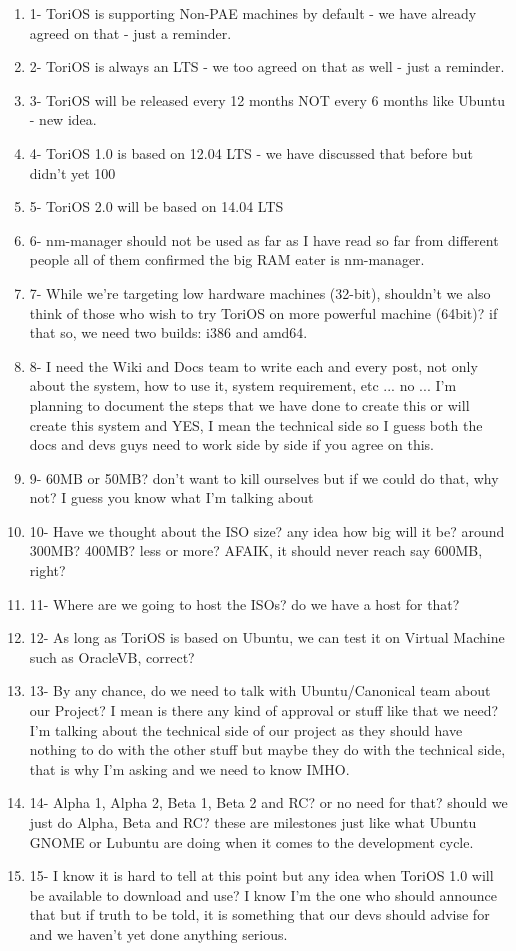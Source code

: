 \documentclass[12pt,a4paper]{book}
\begin{document}
\begin{enumerate}
\item 1- ToriOS is supporting Non-PAE machines by default - we have already agreed on that - just a reminder.
\item 2- ToriOS is always an LTS - we too agreed on that as well - just a reminder.
\item3- ToriOS will be released every 12 months NOT every 6 months like Ubuntu - new idea.
\item4- ToriOS 1.0 is based on 12.04 LTS - we have discussed that before but didn't yet 100%
\item5- ToriOS 2.0 will be based on 14.04 LTS
\item6- nm-manager should not be used as far as I have read so far from different people all of them confirmed the big RAM eater is nm-manager.
\item7- While we're targeting low hardware machines (32-bit), shouldn't we also think of those who wish to try ToriOS on more powerful machine (64bit)? if that so, we need two builds: i386 and amd64.
\item8- I need the Wiki and Docs team to write each and every post, not only about the system, how to use it, system requirement, etc ... no ... I'm planning to document the steps that we have done to create this or will create this system and YES, I mean the technical side so I guess both the docs and devs guys need to work side by side if you agree on this.
\item9- 60MB or 50MB? don't want to kill ourselves but if we could do that, why not? I guess you know what I'm talking about
\item 10- Have we thought about the ISO size? any idea how big will it be? around 300MB? 400MB? less or more? AFAIK, it should never reach say 600MB, right?
\item 11- Where are we going to host the ISOs? do we have a host for that?
\item 12- As long as ToriOS is based on Ubuntu, we can test it on Virtual Machine such as OracleVB, correct?
\item 13- By any chance, do we need to talk with Ubuntu/Canonical team about our Project? I mean is there any kind of approval or stuff like that we need? I'm talking about the technical side of our project as they should have nothing to do with the other stuff but maybe they do with the technical side, that is why I'm asking and we need to know IMHO.
\item 14- Alpha 1, Alpha 2, Beta 1, Beta 2 and RC? or no need for that? should we just do Alpha, Beta and RC? these are milestones just like what Ubuntu GNOME or Lubuntu are doing when it comes to the development cycle.
\item 15- I know it is hard to tell at this point but any idea when ToriOS 1.0 will be available to download and use? I know I'm the one who should announce that but if truth to be told, it is something that our devs should advise for and we haven't yet done anything serious. 
\end{enumerate}
\end{document}
